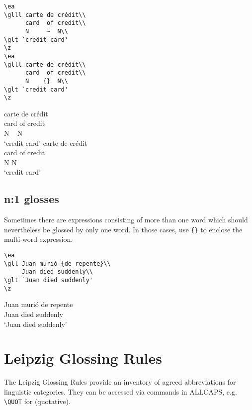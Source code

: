 \documentclass[output=guidelines]{langscibook}
\newcommand{\cmd}[1]{\texttt{\textbackslash#1}}
\begin{document}
\begin{minipage}{.55\textwidth}
\begin{lstlisting}
\ea
\glll carte de crédit\\ 
      card  of credit\\
      N     ~  N\\
\glt `credit card'     
\z
\ea
\glll carte de crédit\\ 
      card  of credit\\
      N    {}  N\\
\glt `credit card'     
\z
 \end{lstlisting}
\end{minipage}
\parbox{.45\textwidth}{ 
\ea
\glll carte de crédit\\ 
      card  of credit\\
      N     ~  N\\
\glt `credit card'     
\z
\ea
\glll carte de crédit\\ 
      card  of credit\\
      N    {}  N\\
\glt `credit card'     
\z
}


\subsection{n:1 glosses}\label{sec:n1glosses}
Sometimes there are expressions consisting of more than one word which should nevertheless be glossed by only one word. In those cases, use \texttt{\{\}} to enclose the multi-word expression. 


\begin{minipage}{.55\textwidth}
\begin{lstlisting}
\ea
\gll Juan murió {de repente}\\
     Juan died suddenly\\
\glt `Juan died suddenly'     
\z
 \end{lstlisting}
\end{minipage}
\parbox{.45\textwidth}{ 
\ea
\gll Juan murió {de repente}\\
     Juan died suddenly\\
\glt `Juan died suddenly'     
\z
}

\section{Leipzig Glossing Rules}
The Leipzig Glossing Rules provide an inventory of agreed abbreviations for linguistic categories. They can be accessed via commands in ALLCAPS, e.g. \cmd{QUOT} for {\QUOT} (quotative).
 
\end{document}
